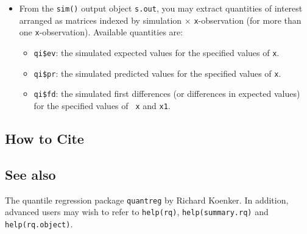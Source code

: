 \begin{itemize}
\item From the {\tt sim()} output object {\tt s.out}, you may extract
  quantities of interest arranged as matrices indexed by simulation
  $\times$ {\tt x}-observation (for more than one {\tt x}-observation).
  Available quantities are:

   \begin{itemize}
   \item {\tt qi\$ev}: the simulated expected values for the specified
     values of {\tt x}.
   \item {\tt qi\$pr}: the simulated predicted values for the specified
     values of {\tt x}.
   \item {\tt qi\$fd}:  the simulated first differences (or
     differences in expected values) for the specified values of {\tt
       x} and {\tt x1}. 
   \end{itemize}
\end{itemize}

\subsection* {How to Cite} 


\subsection* {See also}
The quantile regression package {\tt quantreg} by Richard Koenker. In addition, advanced users may wish to refer to \texttt{help(rq)}, \texttt{help(summary.rq)} and \texttt{help(rq.object)}.
